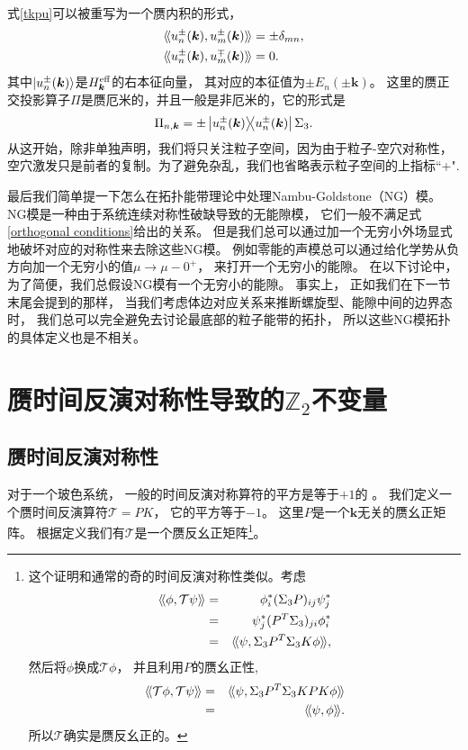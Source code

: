 式\eqref{tkpu}可以被重写为一个赝内积的形式，
\begin{equation}\label{orthogonal conditions}
	\begin{split}
		\langle\!\langle u^\pm_n(\boldsymbol k),u^\pm_m(\boldsymbol k) \rangle\!\rangle &=\pm \delta_{mn},\\
		\langle\!\langle u^\pm_n(\boldsymbol k),u^\mp_m(\boldsymbol k) \rangle\!\rangle &=0.
	\end{split}
\end{equation}
其中$\ket{u^\pm_n(\boldsymbol k)}$是$H^{\text{eff}}_{\boldsymbol k}$的右本征向量，
其对应的本征值为$\pm E_n(\pm \boldsymbol k)$。
这里的赝正交投影算子$\Pi$是赝厄米的，并且一般是非厄米的，它的形式是
\begin{equation}\label{projop}
	\Pi_{n,\boldsymbol k}=\pm \ketbra{u^\pm_n(\boldsymbol k)}{u^\pm_n(\boldsymbol k)}\Sigma_3.
\end{equation}
从这开始，除非单独声明，我们将只关注粒子空间，因为由于粒子-空穴对称性，空穴激发只是前者的复制。为了避免杂乱，我们也省略表示粒子空间的上指标``+".

最后我们简单提一下怎么在拓扑能带理论中处理Nambu-Goldstone（NG）模。
NG模是一种由于系统连续对称性破缺导致的无能隙模，
它们一般不满足式\eqref{orthogonal conditions}给出的关系\cite{Takahashi2015,Watanabe2020}。
但是我们总可以通过加一个无穷小外场显式地破坏对应的对称性来去除这些NG模。
例如零能的声模总可以通过给化学势从负方向加一个无穷小的值$\mu\rightarrow \mu-0^+$，
来打开一个无穷小的能隙。
在以下讨论中，为了简便，我们总假设NG模有一个无穷小的能隙。
事实上，
正如我们在下一节末尾会提到的那样，
当我们考虑体边对应关系来推断螺旋型、能隙中间的边界态时，
我们总可以完全避免去讨论最底部的粒子能带的拓扑，
所以这些NG模拓扑的具体定义也是不相关\cite{Furukawa2015}。

\section{赝时间反演对称性导致的$\mathbb Z_2$不变量}\label{sec2}

\subsection{赝时间反演对称性}

对于一个玻色系统，
一般的时间反演对称算符的平方是等于$+1$的 \cite{Sakurai2014}。
我们定义一个赝时间反演算符$\mathcal{T}=PK$，
它的平方等于$-1$。
这里$P$是一个$\boldsymbol k$无关的赝幺正矩阵。
根据定义我们有$\mathcal T$是一个赝反幺正矩阵\footnote{
这个证明和通常的奇的时间反演对称性类似。考虑
\begin{eqnarray*}
	\langle\!\langle \phi,\mathcal{T}\psi \rangle\!\rangle &=& \phi^*_i (\Sigma_3P)_{ij} \psi^*_j\\
	&=& \psi_j^* (P^T\Sigma_3)_{ji}\phi^*_i\\
	&=& \langle\!\langle \psi,\Sigma_3 P^T\Sigma_3 K\phi \rangle\!\rangle,
\end{eqnarray*}
然后将$\phi$换成$\mathcal{T}\phi$，
并且利用$P$的赝幺正性,
\begin{eqnarray*}
	\langle\!\langle \mathcal{T}\phi,\mathcal{T}\psi \rangle\!\rangle &=& \langle\!\langle \psi,\Sigma_3 P^T \Sigma_3 KPK\phi \rangle\!\rangle\\
	& = &\langle\!\langle \psi,\phi \rangle\!\rangle.
\end{eqnarray*}
所以$\mathcal T$确实是赝反幺正的。}。

